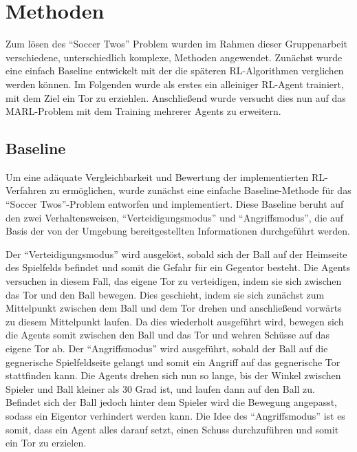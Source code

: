 \documentclass[twocolumn]{webofc}
\begin{document}
\section{Methoden} \label{sec-1}

Zum lösen des \enquote{Soccer Twos} Problem wurden im Rahmen dieser Gruppenarbeit verschiedene, unterschiedlich komplexe, Methoden angewendet. Zunächst wurde eine einfach Baseline entwickelt mit der die späteren \ac{RL}-Algorithmen verglichen werden können. Im Folgenden wurde als erstes ein alleiniger \ac{RL}-Agent trainiert, mit dem Ziel ein Tor zu erziehlen. Anschließend wurde versucht dies nun auf das \ac{MARL}-Problem mit dem Training mehrerer Agents zu erweitern.

\subsection{Baseline}

Um eine adäquate Vergleichbarkeit und Bewertung der implementierten \ac{RL}-Verfahren zu ermöglichen, wurde zunächst eine einfache Baseline-Methode für das \enquote{Soccer Twos}-Problem entworfen und implementiert. Diese Baseline beruht auf den zwei Verhaltensweisen, \enquote{Verteidigungsmodus} und \enquote{Angriffsmodus}, die auf Basis der von der Umgebung bereitgestellten Informationen durchgeführt werden.

Der \enquote{Verteidigungsmodus} wird ausgelöst, sobald sich der Ball auf der Heimseite des Spielfelds befindet und somit die Gefahr für ein Gegentor besteht. Die Agents versuchen in diesem Fall, das eigene Tor zu verteidigen, indem sie sich zwischen das Tor und den Ball bewegen. Dies geschieht, indem sie sich zunächst zum Mittelpunkt zwischen dem Ball und dem Tor drehen und anschließend vorwärts zu diesem Mittelpunkt laufen. Da dies wiederholt ausgeführt wird, bewegen sich die Agents somit zwischen den Ball und das Tor und wehren Schüsse auf das eigene Tor ab.
Der \enquote{Angriffsmodus} wird ausgeführt, sobald der Ball auf die gegnerische Spielfeldseite gelangt und somit ein Angriff auf das gegnerische Tor stattfinden kann. Die Agents drehen sich nun so lange, bis der Winkel zwischen Spieler und Ball kleiner als 30 Grad ist, und laufen dann auf den Ball zu. Befindet sich der Ball jedoch hinter dem Spieler wird die Bewegung angepasst, sodass ein Eigentor verhindert werden kann. Die Idee des \enquote{Angriffsmodus} ist es somit, dass ein Agent alles darauf setzt, einen Schuss durchzuführen und somit ein Tor zu erzielen.
\end{document}
